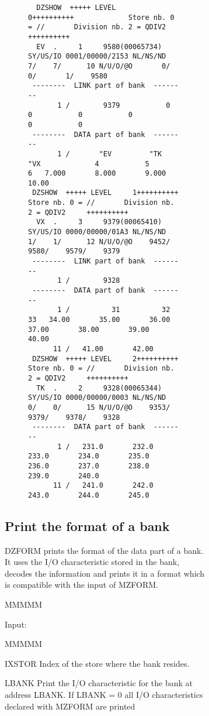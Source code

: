 \begin{figure}
\begin{figure}
\begin{figure}
\begin{verbatim}
  DZSHOW  +++++ LEVEL     0++++++++++             Store nb. 0 = //       Division nb. 2 = QDIV2     ++++++++++
  EV  .     1     9580(00065734) SY/US/IO 0001/00000/2153 NL/NS/ND    7/    7/      10 N/U/O/@O       0/       0/       1/    9580
 --------  LINK part of bank  --------
       1 /        9379           0           0           0           0           0           0
 --------  DATA part of bank  --------
       1 /       "EV         "TK         "VX             4           5           6   7.000       8.000       9.000       10.00
 DZSHOW  +++++ LEVEL     1++++++++++             Store nb. 0 = //       Division nb. 2 = QDIV2     ++++++++++
  VX  .     3     9379(00065410) SY/US/IO 0000/00000/01A3 NL/NS/ND    1/    1/      12 N/U/O/@O    9452/    9580/    9579/    9379
 --------  LINK part of bank  --------
       1 /        9328
 --------  DATA part of bank  --------
       1 /          31          32          33   34.00       35.00       36.00       37.00       38.00       39.00       40.00
      11 /   41.00       42.00
 DZSHOW  +++++ LEVEL     2++++++++++             Store nb. 0 = //       Division nb. 2 = QDIV2     ++++++++++
  TK  .     2     9328(00065344) SY/US/IO 0000/00000/0003 NL/NS/ND    0/    0/      15 N/U/O/@O    9353/    9379/    9378/    9328
 --------  DATA part of bank  --------
       1 /   231.0       232.0       233.0       234.0       235.0       236.0       237.0       238.0       239.0       240.0
      11 /   241.0       242.0       243.0       244.0       245.0
\end{verbatim}
\end{figure}
\subsection{Print the format of a bank}
\par DZFORM prints the format of the data part of a bank.
It uses the I/O characteristic stored in the bank, decodes the
information and prints it in a format which is compatible with the
input of MZFORM.
\begin{DL}{MMMMM}
\item[Input:
]
\begin{DL}{MMMMM}
\item[IXSTOR
]Index of the store where the bank resides.
\item[LBANK
]Print the I/O characteristic for the bank at address LBANK.
\newline If LBANK = 0 all I/O characteristics declared with MZFORM are
printed
\end{DL}
\end{DL}

\end{figure}
\end{figure}
